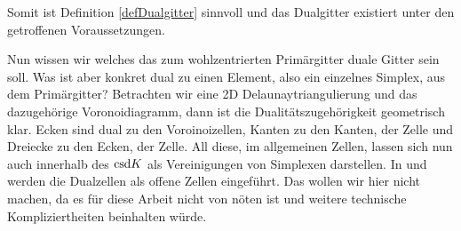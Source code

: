     Somit ist Definition \ref{defDualgitter} sinnvoll und das Dualgitter existiert unter den getroffenen Voraussetzungen.

    Nun wissen wir welches das zum wohlzentrierten Primärgitter duale Gitter sein soll.
    Was ist aber konkret dual zu einen Element, also ein einzelnes Simplex,  aus dem Primärgitter?
    Betrachten wir eine 2D Delaunaytriangulierung und das dazugehörige Voronoidiagramm, dann ist die Dualitätszugehörigkeit geometrisch klar.
    Ecken sind dual zu den Voroinoizellen, Kanten zu den Kanten, der Zelle und Dreiecke zu den Ecken, der Zelle.
    All diese, im allgemeinen Zellen, lassen sich nun auch innerhalb des \( \text{csd} K \) als Vereinigungen von Simplexen darstellen.
    In \cite{hirani} und \cite{munkres} werden die Dualzellen als offene Zellen eingeführt.
    Das wollen wir hier nicht machen, da es für diese Arbeit nicht von nöten ist und weitere technische Kompliziertheiten beinhalten würde.

